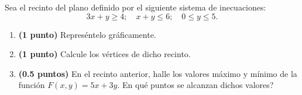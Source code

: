 
Sea el recinto del plano definido por el siguiente sistema de inecuaciones:
\[
3x+y\geq4;\quad x+y\leq6;\quad0\leq y\leq5.
\]
\begin{enumerate}[label=\alph*)]
\item \textbf{(1 punto)} Represéntelo gráficamente.
\item \textbf{(1 punto)} Calcule los vértices de dicho recinto.
\item \textbf{(0.5 puntos)} En el recinto anterior, halle los valores máximo y mínimo de la función $F(x,y)=5x+3y$. \textquestiondown{}En qué puntos se alcanzan dichos valores?
\end{enumerate}
